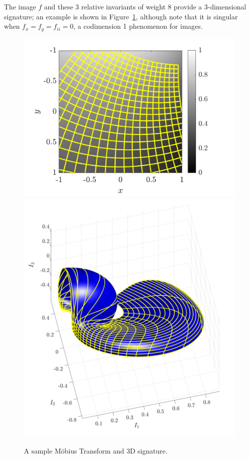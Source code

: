 \documentclass[review,onefignum,onetabnum]{siamonline190516}
\begin{document}
The image $f$ and these 3 relative invariants of weight 8 provide a 3-dimensional signature; an example is shown in Figure~\ref{fig:mobius}, although note that it is singular when $f_x=f_y=f_{ii}=0$, a codimension 1 phenomenon for images. 





\begin{figure}
\centering
\includegraphics[width=.45\textwidth]{Figs/f_transformed_Mobius.png}
\includegraphics[width=.45\textwidth]{Figs/Mobius_signature.png}
\caption{A sample M\"obius Transform and 3D signature.}
\label{fig:mobius}
\end{figure}
\end{document}
